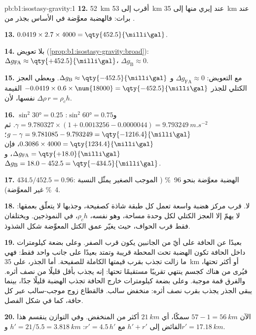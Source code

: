 \begin{solution}{pb:b1:isostasy-gravity:1}
\textbf{12.} \qty{52}{km} أقرب إلى \qty{53}{km} عند إيري منها إلى \qty{35}{km} عند برات: فالهضبة معوَّضة في الأساس بجذر من .

\textbf{13.} $0.0419\times2.7\times4000 = \qty{452.5}{\milli\gal}$.

\textbf{14.} بلا تعويض (\cref{prop:b1:isostasy-gravity:broad}):
$\Delta g_{\mathrm{FA}} \approx \qty{+452.5}{\milli\gal}$،
$\Delta g_{\mathrm B} \approx 0$.

\textbf{15.} مع التعويض: $\Delta g_{\mathrm{FA}} \approx 0$ و
$\Delta g_{\mathrm B} \approx \qty{-452.5}{\milli\gal}$. ويعطي العجز الكتلي للجذر $-0.0419\times0.6\times\num{18000} = \qty{-452.5}{\milli\gal}$ القيمة نفسها، لأن $\Delta\rho\,r = \rho_c h$.

\textbf{16.} $\sin^2\ang{30} = 0.25$ و$\sin^2\ang{60} = 0.75$:
$\gamma = 9.780327\times(1 + 0.0013256 - 0.0000044) = \qty{9.793249}{m.s^{-2}}$.
ثم $g - \gamma = 9.781085 - 9.793249 = \qty{-1216.4}{\milli\gal}$؛ 
$0.3086\times4000 = \qty{1234.4}{\milli\gal}$، فإن
$\Delta g_{\mathrm{FA}} = \qty{+18.0}{\milli\gal}$، و
$\Delta g_{\mathrm B} = 18.0 - 452.5 = \qty{-434.5}{\milli\gal}$.

\textbf{17.} $434.5/452.5 = 0.96$: الهضبة معوَّضة بنحو \qty{96}{\percent} ( الموجب الصغير يمثّل النسبة \qty{4}{\percent} غير المعوَّضة).

\textbf{18.} لا. قرب مركز هضبة واسعة تعمل كل طبقة شاذة كصفيحة، وجذبها لا يتعلّق بعمقها: لا يهمّ إلا العجز الكتلي لكل وحدة مساحة، وهو نفسه، $\rho_c h$، في النموذجين. ويختلفان فقط قرب الحواف، حيث يغيّر عمق الكتل المعوِّضة شكل الشذوذ.

\textbf{19.} بعيدًا عن الحافة على أيّ من الجانبين يكون  قرب الصفر. وعلى بضعة كيلومترات داخل الحافة تكون الهضبة تحت المحطة قريبة وتمتد بعيدًا على جانب واحد فقط: فهي ما زالت تجذب بقرب قيمتها الكاملة للصفيحة. أما الجذر، على \qty{35}{km} أو أكثر تحتها، فيُرى من هناك كجسم ينتهي تقريبًا مستقيمًا تحتها: إنه يجذب بأقل قليلًا من نصف أثره. والفرق قمة موجبة. وعلى بضعة كيلومترات خارج الحافة تجذب الهضبة قليلًا جدًا، بينما يبقى الجذر يجذب بقرب نصف أثره: منخفض سالب. فالقطاع زوج موجب-سالب عبر كل حافة، كما في شكل الفصل.

\textbf{20.}  الآن $57 - 1 = \qty{56}{km}$ سمكًا، أي $\qty{21}{km}$ أكثر من  المنخفض. وفي التوازن ينقسم هذا الفائض إلى $h' + r'$ مع $r' = 4.5\,h'$: $h' = 21/5.5 = \qty{3.818}{km}$ و$r' = \qty{17.18}{km}$.


\end{solution}
